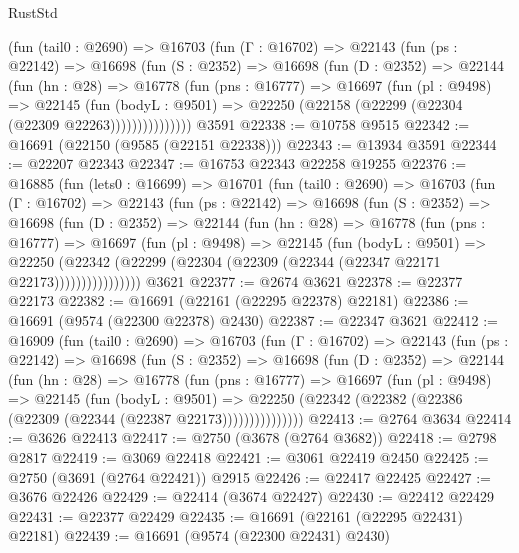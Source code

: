 \begin{lexlean}{RustStd}
\begin{coremodule}
        (fun (tail0 : @2690) =>
        @16703
          (fun (Γ : @16702) =>
          @22143
            (fun (ps : @22142) =>
            @16698
              (fun (S : @2352) =>
              @16698
                (fun (D : @2352) =>
                @22144
                  (fun (hn : @28) =>
                  @16778
                    (fun (pns : @16777) =>
                    @16697
                      (fun (pl : @9498) =>
                      @22145
                        (fun (bodyL : @9501) =>
                        @22250 (@22158 (@22299 (@22304 (@22309 @22263)))))))))))))))
    @3591
@22338 := @10758 @9515
@22342 := @16691 (@22150 (@9585 (@22151 @22338)))
@22343 := @13934 @3591
@22344 := @22207 @22343
@22347 := @16753 @22343 @22258 @19255
@22376 := @16885
    (fun (lets0 : @16699) =>
    @16701
      (fun (tail0 : @2690) =>
      @16703
        (fun (Γ : @16702) =>
        @22143
          (fun (ps : @22142) =>
          @16698
            (fun (S : @2352) =>
            @16698
              (fun (D : @2352) =>
              @22144
                (fun (hn : @28) =>
                @16778
                  (fun (pns : @16777) =>
                  @16697
                    (fun (pl : @9498) =>
                    @22145
                      (fun (bodyL : @9501) =>
                      @22250
                        (@22342
                          (@22299 (@22304 (@22309 (@22344 (@22347 @22171 @22173))))))))))))))))
    @3621
@22377 := @2674 @3621
@22378 := @22377 @22173
@22382 := @16691 (@22161 (@22295 @22378) @22181)
@22386 := @16691 (@9574 (@22300 @22378) @2430)
@22387 := @22347 @3621
@22412 := @16909
    (fun (tail0 : @2690) =>
    @16703
      (fun (Γ : @16702) =>
      @22143
        (fun (ps : @22142) =>
        @16698
          (fun (S : @2352) =>
          @16698
            (fun (D : @2352) =>
            @22144
              (fun (hn : @28) =>
              @16778
                (fun (pns : @16777) =>
                @16697
                  (fun (pl : @9498) =>
                  @22145
                    (fun (bodyL : @9501) =>
                    @22250 (@22342 (@22382 (@22386 (@22309 (@22344 (@22387 @22173)))))))))))))))
@22413 := @2764 @3634
@22414 := @3626 @22413
@22417 := @2750 (@3678 (@2764 @3682))
@22418 := @2798 @2817
@22419 := @3069 @22418
@22421 := @3061 @22419 @2450
@22425 := @2750 (@3691 (@2764 @22421)) @2915
@22426 := @22417 @22425
@22427 := @3676 @22426
@22429 := @22414 (@3674 @22427)
@22430 := @22412 @22429
@22431 := @22377 @22429
@22435 := @16691 (@22161 (@22295 @22431) @22181)
@22439 := @16691 (@9574 (@22300 @22431) @2430)

\end{coremodule}
\end{lexlean}
